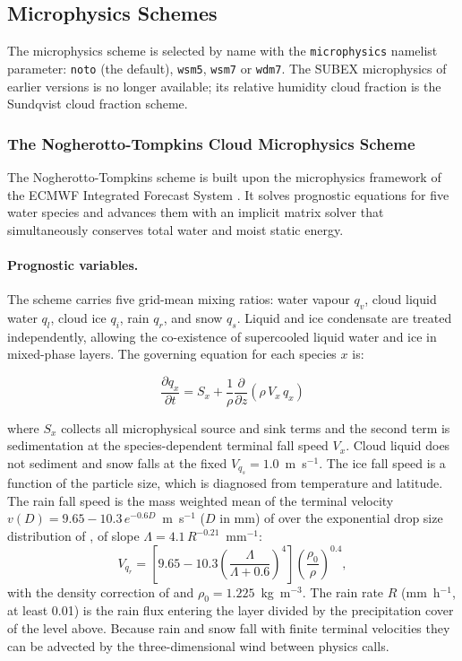 {\subsection{Microphysics Schemes}

The microphysics scheme is selected by name with the \texttt{microphysics}
namelist parameter: \texttt{noto} (the default), \texttt{wsm5},
\texttt{wsm7} or \texttt{wdm7}. The SUBEX microphysics of earlier versions
is no longer available; its relative humidity cloud fraction is the
Sundqvist cloud fraction scheme.

\subsubsection{The Nogherotto-Tompkins Cloud Microphysics Scheme}
\label{sec:nogtom}

The Nogherotto-Tompkins scheme \citep{gmd-9-2533-2016} is built upon the
microphysics framework of the ECMWF Integrated Forecast System
\citep{tiedtke:93,tompkins:07}.  It solves prognostic equations for five
water species and advances them with an implicit matrix solver that
simultaneously conserves total water and moist static energy.

\paragraph{Prognostic variables.}
The scheme carries five grid-mean mixing ratios: water vapour $q_v$, cloud
liquid water $q_l$, cloud ice $q_i$, rain $q_r$, and snow $q_s$.  Liquid and
ice condensate are treated independently, allowing the co-existence of
supercooled liquid water and ice in mixed-phase layers.  The governing equation
for each species $x$ is:

\begin{equation}
  \frac{\partial q_x}{\partial t} = S_x + \frac{1}{\rho}\frac{\partial}
  {\partial z}\!\left(\rho\,V_x\,q_x\right)
\end{equation}

where $S_x$ collects all microphysical source and sink terms and the second
term is sedimentation at the species-dependent terminal fall speed $V_x$.
Cloud liquid does not sediment and snow falls at the fixed
$V_{q_s} = 1.0$~m~s$^{-1}$. The ice fall speed is a function of the particle
size, which is diagnosed from temperature and latitude. The rain fall speed
is the mass weighted mean of the terminal velocity
$v(D) = 9.65 - 10.3\,e^{-0.6D}$~m~s$^{-1}$ ($D$ in mm) of
\citet{Atlas_73} over the exponential drop size distribution of
\citet{Marshall_48}, of slope $\Lambda = 4.1\,R^{-0.21}$~mm$^{-1}$:
\begin{equation}
  V_{q_r} = \left[9.65 - 10.3\left(\frac{\Lambda}{\Lambda+0.6}
            \right)^{4}\right]\left(\frac{\rho_0}{\rho}\right)^{0.4},
\end{equation}
with the density correction of \citet{Foote_69} and
$\rho_0 = 1.225$~kg~m$^{-3}$. The rain rate $R$ (mm~h$^{-1}$, at least
0.01) is the rain flux entering the layer divided by the precipitation cover
of the level above. Because rain and snow fall with finite terminal
velocities they can be advected by the three-dimensional wind between physics
calls.

}
